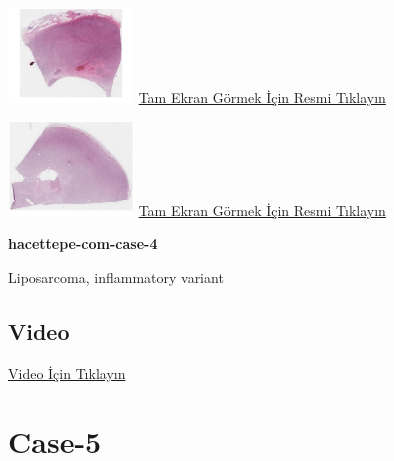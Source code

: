 \documentclass[
  letterpaper,
  DIV=11,
  numbers=noendperiod]{scrreprt}
\begin{document}
\href{https://images.patolojiatlasi.com/hacettepe-com-case-4/HE.html}{\includegraphics[width=0.25\textwidth,height=\textheight]{./screenshots/hacettepe-com-case-4-1_screenshot.png}}
\href{https://images.patolojiatlasi.com/hacettepe-com-case-4/HE1.html}{Tam
Ekran Görmek İçin Resmi Tıklayın}

\href{https://images.patolojiatlasi.com/hacettepe-com-case-4/HE2.html}{\includegraphics[width=0.25\textwidth,height=\textheight]{./screenshots/hacettepe-com-case-4-2_screenshot.png}}
\href{https://images.patolojiatlasi.com/hacettepe-com-case-4/HE2.html}{Tam
Ekran Görmek İçin Resmi Tıklayın}

\textbf{hacettepe-com-case-4}

\begin{tcolorbox}[enhanced jigsaw, left=2mm, toprule=.15mm, rightrule=.15mm, bottomrule=.15mm, leftrule=.75mm, colback=white, colframe=quarto-callout-tip-color-frame, toptitle=1mm, breakable, titlerule=0mm, colbacktitle=quarto-callout-tip-color!10!white, bottomtitle=1mm, title=\textcolor{quarto-callout-tip-color}{\faLightbulb}\hspace{0.5em}{Tanı}, arc=.35mm, opacitybacktitle=0.6, opacityback=0, coltitle=black]

Liposarcoma, inflammatory variant

\end{tcolorbox}

\hypertarget{video-2}{%
\subsection{Video}\label{video-2}}

\href{https://www.youtube.com/watch?v=Akp6H3myCIo}{Video İçin Tıklayın}

\hypertarget{sec-hacettepe-case-of-the-month-case-5}{%
\section{Case-5}\label{sec-hacettepe-case-of-the-month-case-5}}
\end{document}
